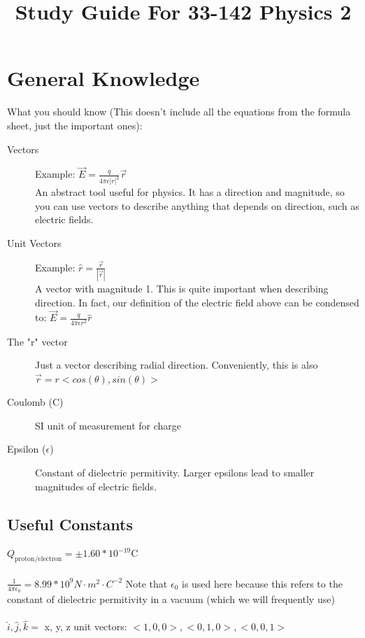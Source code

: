 \documentclass{article}
\title{
    \vspace{2in}
    \textmd{\textbf{Study Guide For 33-142 Physics 2}}\\
    \vspace{0.1in}\large{\textit{\hmwkClassInstructor}}
    \vspace{3in}
}
\author{\hmwkAuthorName}
\date{}
\begin{document}
\maketitle

\pagebreak
\section{General Knowledge}
What you should know (This doesn't include all the equations from the formula sheet, just the important ones):\\
\label{definitions}
\begin{description}
\item[Vectors]
Example: $\vec{E} = \frac{q}{4\pi\epsilon |r|^3}\vec{r}$\\
An abstract tool useful for physics. It has a direction and magnitude, so you can use vectors to describe anything that depends on direction, such as electric fields. 

\item[Unit Vectors]
Example: $\hat{r} = \frac{\vec{r}}{|\vec{r}|}$\\
A vector with magnitude 1. This is quite important when describing direction. In fact, our definition of the electric field above can be condensed to: $\vec{E} = \frac{q}{4\pi\epsilon r^2} \hat{r}$

\item[The "r" vector]
Just a vector describing radial direction. Conveniently, this is also $\vec{r} = r <cos(\theta), sin(\theta)>$

\item[Coulomb (C)]
SI unit of measurement for charge

\item[Epsilon ($\epsilon$)]
Constant of dielectric permitivity. Larger epsilons lead to smaller magnitudes of electric fields.

\end{description} 

\subsection{Useful Constants}
$Q_{\text{proton/electron}} = \pm1.60 * 10^{-19} \text{C}$\\
\\
$\frac{1}{4\pi\epsilon_0} = 8.99 * 10^9 N\cdot m^2 \cdot C^{-2}$ Note that $\epsilon_0$ is used here because this refers to the constant of dielectric permitivity in a vacuum (which we will frequently use) \\
\\
$\hat{i}, \hat{j}, \hat{k} = $ x, y, z unit vectors: $<1,0,0>, <0,1,0>, <0,0,1>$
\end{document}
